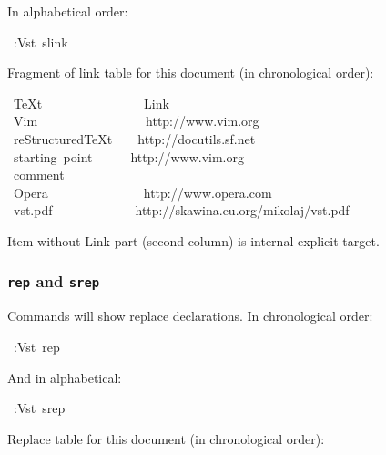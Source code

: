 \documentclass[12pt]{article}
\begin{document}
In alphabetical order:

\begin{ttfamily}\begin{flushleft}
\mbox{~:Vst~slink}\\
\end{flushleft}\end{ttfamily}

Fragment of link table for this document (in chronological order):

\begin{ttfamily}\begin{flushleft}
\mbox{~\TeX{}t~~~~~~~~~~~~~~~~Link}\\
\mbox{~Vim~~~~~~~~~~~~~~~~~http://www.vim.org}\\
\mbox{~reStructured\TeX{}t~~~~http://docutils.sf.net}\\
\mbox{~starting~point~~~~~~http://www.vim.org}\\
\mbox{~comment}\\
\mbox{~Opera~~~~~~~~~~~~~~~http://www.opera.com}\\
\mbox{~vst.pdf~~~~~~~~~~~~~http://skawina.eu.org/mikolaj/vst.pdf}\\
\end{flushleft}\end{ttfamily}

Item without Link part (second column) is internal explicit target.

\hypertarget{l9696rep9696-and-9696srep9696}{}
\subsubsection{\texttt{rep} and \texttt{srep}}

Commands will show replace declarations. In chronological order:

\begin{ttfamily}\begin{flushleft}
\mbox{~:Vst~rep}\\
\end{flushleft}\end{ttfamily}

And in alphabetical:

\begin{ttfamily}\begin{flushleft}
\mbox{~:Vst~srep}\\
\end{flushleft}\end{ttfamily}

Replace table for this document (in chronological order):
\end{document}
